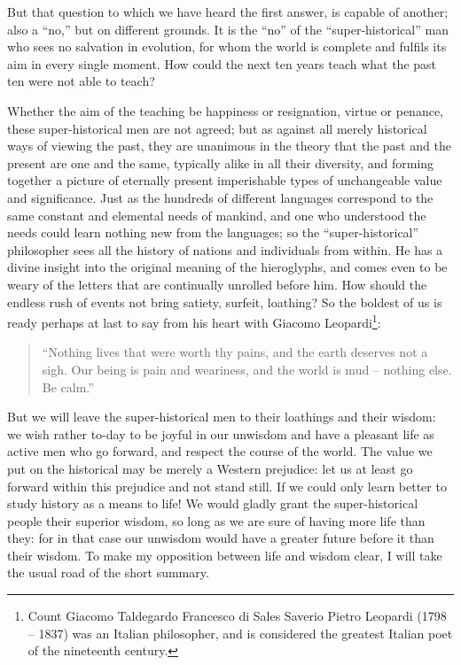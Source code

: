 But that question to which we have heard the first answer, is capable
of another; also a \enquote{no,} but on different grounds. It is the \enquote{no} of
the \enquote{super-historical} man who sees no salvation in evolution, for
whom the world is complete and fulfils its aim in every single
moment. How could the next ten years teach what the past ten were not
able to teach?

Whether the aim of the teaching be happiness or resignation, virtue
or penance, these super-historical men are not agreed; but as against
all merely historical ways of viewing the past, they are unanimous in
the theory that the past and the present are one and the same,
typically alike in all their diversity, and forming together a
picture of eternally present imperishable types of unchangeable value
and significance. Just as the hundreds of different languages
correspond to the same constant and elemental needs of mankind, and
one who understood the needs could learn nothing new from the
languages; so the \enquote{super-historical} philosopher sees all the history
of nations and individuals from within. He has a divine insight into
the original meaning of the hieroglyphs, and comes even to be weary
of the letters that are continually unrolled before him. How should
the endless rush of events not bring satiety, surfeit, loathing? So
the boldest of us is ready perhaps at last to say from his heart with
Giacomo Leopardi\footnote{Count Giacomo Taldegardo Francesco di Sales Saverio Pietro Leopardi (1798 -- 1837) was an Italian philosopher, and is considered the greatest Italian poet of the nineteenth century.}: 
\begin{quote}
\enquote{Nothing lives that were worth thy pains, and the
earth deserves not a sigh. Our being is pain and weariness, and the
world is mud -- nothing else. Be calm.}
\end{quote}

\noindent
But we will leave the super-historical men to their loathings and
their wisdom: we wish rather to-day to be joyful in our unwisdom and
have a pleasant life as active men who go forward, and respect the
course of the world. The value we put on the historical may be merely
a Western prejudice: let us at least go forward within this prejudice
and not stand still. If we could only learn better to study history
as a means to life! We would gladly grant the super-historical people
their superior wisdom, so long as we are sure of having more life
than they: for in that case our unwisdom would have a greater future
before it than their wisdom. To make my opposition between life and
wisdom clear, I will take the usual road of the short summary.

